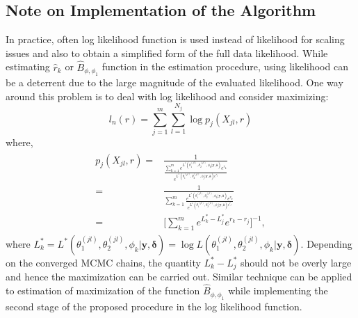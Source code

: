 \documentclass[11pt]{article}
\theoremstyle{remboldstyle}
\newcommand{\y}{{\boldsymbol{y}}}
\newcommand{\de}{{\boldsymbol{\delta}}}
\begin{document}
\subsection{Note on Implementation of the Algorithm}
\noindent
In practice, often log likelihood function is used instead of likelihood for scaling issues and also to obtain a simplified form of the full data likelihood. While estimating $\hat{r}_k$ or $\hat{B}_{\phi, \phi_1}$ function in the estimation procedure, using likelihood can be a deterrent due to the large magnitude of the evaluated likelihood. One way around this problem is to deal with log likelihood and consider maximizing:
\begin{equation}
l_n(r) = \sum\limits_{j = 1}^m\sum\limits_{l = 1}^{N_j} \log p_j(X_{jl},r)
\end{equation}
where,
\begin{align}
\begin{split}
p_j(X_{jl},r) = {} & \frac{1}{\frac{\sum\limits_{k=1}^{m} e^{L^{*}(\theta_1^{(jl)}, \theta_2^{(jl)}, \phi_k| \y, \de)}e^{r_k}}  {e^{L^{*}(\theta_1^{(jl)}, \theta_2^{(jl)}, \phi_j| \y, \de)e^{r_j}}}}\\
= & \frac{1}{\sum\limits_{k=1}^{m} \frac{ e^{L^{*}(\theta_1^{(jl)}, \theta_2^{(jl)}, \phi_k| \y, \de)}e^{r_k}}  {e^{L^{*}(\theta_1^{(jl)}, \theta_2^{(jl)}, \phi_j| \y, \de)e^{r_j}}}}\\
= & \bigg[\sum\limits_{k=1}^{m} e^{L^*_k - L^*_j} e^{r_k - r_j}\bigg]^{-1},
\end{split}
\end{align}
where $L^*_k = L^{*}(\theta_1^{(jl)}, \theta_2^{(jl)}, \phi_k| \y, \de) = \log  L(\theta_1^{(jl)}, \theta_2^{(jl)}, \phi_k| \y, \de)$. Depending on the converged MCMC chains, the quantity $L^*_k - L^*_j$ should not be overly large and hence the maximization can be carried out. Similar technique can be applied to estimation of maximization of the function $\hat{B}_{\phi, \phi_1}$ while implementing the second stage of the proposed procedure in the log likelihood function. 
\end{document}
